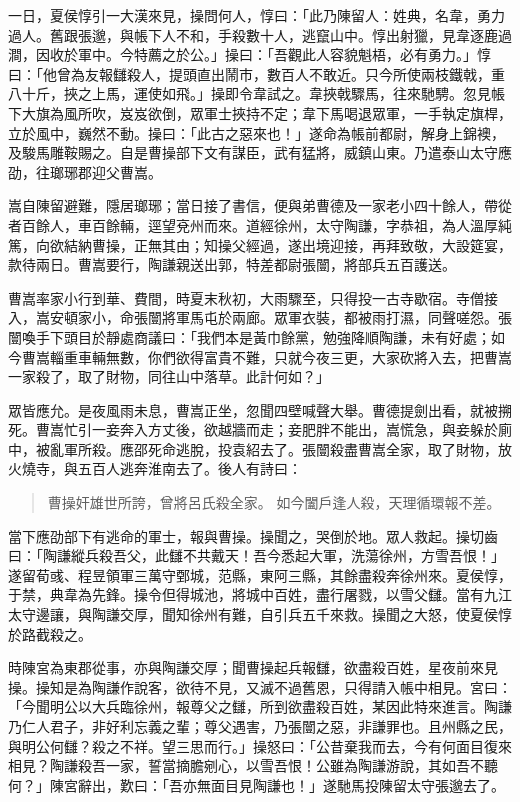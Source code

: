 一日，夏侯惇引一大漢來見，操問何人，惇曰：「此乃陳留人：姓典，名韋，勇力過人。舊跟張邈，與帳下人不和，手殺數十人，逃竄山中。惇出射獵，見韋逐鹿過澗，因收於軍中。今特薦之於公。」操曰：「吾觀此人容貌魁梧，必有勇力。」惇曰：「他曾為友報讎殺人，提頭直出鬧市，數百人不敢近。只今所使兩枝鐵戟，重八十斤，挾之上馬，運使如飛。」操即令韋試之。韋挾戟驟馬，往來馳騁。忽見帳下大旗為風所吹，岌岌欲倒，眾軍士挾持不定；韋下馬喝退眾軍，一手執定旗桿，立於風中，巍然不動。操曰：「此古之惡來也！」遂命為帳前都尉，解身上錦襖，及駿馬雕鞍賜之。自是曹操部下文有謀臣，武有猛將，威鎮山東。乃遣泰山太守應劭，往瑯琊郡迎父曹嵩。

嵩自陳留避難，隱居瑯琊；當日接了書信，便與弟曹德及一家老小四十餘人，帶從者百餘人，車百餘輛，逕望兗州而來。道經徐州，太守陶謙，字恭祖，為人溫厚純篤，向欲結納曹操，正無其由；知操父經過，遂出境迎接，再拜致敬，大設筵宴，款待兩日。曹嵩要行，陶謙親送出郭，特差都尉張闓，將部兵五百護送。

曹嵩率家小行到華、費間，時夏末秋初，大雨驟至，只得投一古寺歇宿。寺僧接入，嵩安頓家小，命張闓將軍馬屯於兩廊。眾軍衣裝，都被雨打濕，同聲嗟怨。張闓喚手下頭目於靜處商議曰：「我們本是黃巾餘黨，勉強降順陶謙，未有好處；如今曹嵩輜重車輛無數，你們欲得富貴不難，只就今夜三更，大家砍將入去，把曹嵩一家殺了，取了財物，同往山中落草。此計何如？」

眾皆應允。是夜風雨未息，曹嵩正坐，忽聞四壁喊聲大舉。曹德提劍出看，就被搠死。曹嵩忙引一妾奔入方丈後，欲越牆而走；妾肥胖不能出，嵩慌急，與妾躲於廁中，被亂軍所殺。應邵死命逃脫，投袁紹去了。張闓殺盡曹嵩全家，取了財物，放火燒寺，與五百人逃奔淮南去了。後人有詩曰：

\begin{quote}
曹操奸雄世所誇，曾將呂氏殺全家。
如今闔戶逢人殺，天理循環報不差。
\end{quote}

當下應劭部下有逃命的軍士，報與曹操。操聞之，哭倒於地。眾人救起。操切齒曰：「陶謙縱兵殺吾父，此讎不共戴天！吾今悉起大軍，洗蕩徐州，方雪吾恨！」遂留荀彧、程昱領軍三萬守鄄城，范縣，東阿三縣，其餘盡殺奔徐州來。夏侯惇，于禁，典韋為先鋒。操令但得城池，將城中百姓，盡行屠戮，以雪父讎。當有九江太守邊讓，與陶謙交厚，聞知徐州有難，自引兵五千來救。操聞之大怒，使夏侯惇於路截殺之。

時陳宮為東郡從事，亦與陶謙交厚；聞曹操起兵報讎，欲盡殺百姓，星夜前來見操。操知是為陶謙作說客，欲待不見，又滅不過舊恩，只得請入帳中相見。宮曰：「今聞明公以大兵臨徐州，報尊父之讎，所到欲盡殺百姓，某因此特來進言。陶謙乃仁人君子，非好利忘義之輩；尊父遇害，乃張闓之惡，非謙罪也。且州縣之民，與明公何讎？殺之不祥。望三思而行。」操怒曰：「公昔棄我而去，今有何面目復來相見？陶謙殺吾一家，誓當摘膽剜心，以雪吾恨！公雖為陶謙游說，其如吾不聽何？」陳宮辭出，歎曰：「吾亦無面目見陶謙也！」遂馳馬投陳留太守張邈去了。

